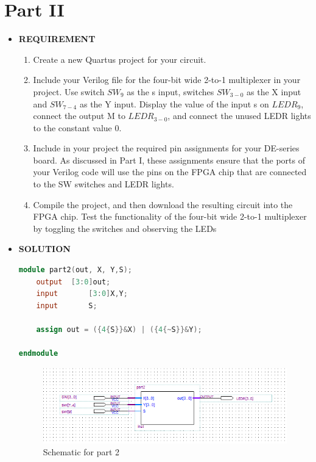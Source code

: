 \documentclass[a4paper, 12pt]{report}
\begin{document}
\section{Part II }
\begin{itemize}
    \item [] \textbf{REQUIREMENT}
        \begin{enumerate}
            \item Create a new Quartus project for your circuit.
            \item Include your Verilog file for the four-bit wide 2-to-1 multiplexer in your project. Use switch $SW_9$ as the s input, switches $SW_{3-0}$ as the X input and $SW_{7-4}$ as the Y input. Display the value of the input s on $LEDR_9$, connect the output M to $LEDR_{3-0}$, and connect the unused LEDR lights to the constant value 0.
            \item Include in your project the required pin assignments for your DE-series board. As discussed in Part I, these assignments ensure that the ports of your Verilog code will use the pins on the FPGA chip that are connected to the SW switches and LEDR lights.
            \item Compile the project, and then download the resulting circuit into the FPGA chip. Test the functionality of the four-bit wide 2-to-1 multiplexer by toggling the switches and observing the LEDs
        \end{enumerate}
    \item [] \textbf{SOLUTION}
        \begin{lstlisting}[language= verilog]
module part2(out, X, Y,S);
	output	[3:0]out;
	input		[3:0]X,Y;
	input		S;
	
	assign out = ({4{S}}&X) | ({4{~S}}&Y);
	
endmodule
        \end{lstlisting}
        \begin{figure}[h]
            \centering
            \includegraphics[scale =0.9]{source/picture/Lab1/Lab1_2.png}
            \caption{Schematic for part 2}
        \end{figure}
\end{itemize}
\clearpage
\end{document}
